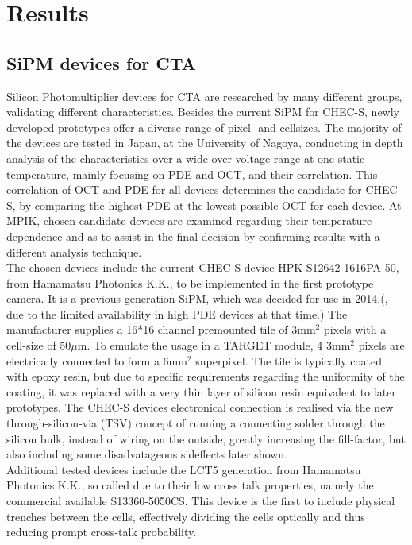 \documentclass[12pt,article,type=msc,colorback,accentcolor=tud9c]{tudthesis}
\begin{document}
\newpage
\section{Results}
\label{sec:results_ch}
\subsection{SiPM devices for CTA}
Silicon Photomultiplier devices for CTA are researched by many different groups, validating different characteristics. Besides the current SiPM for CHEC-S, newly developed prototypes offer a diverse range of pixel- and cellsizes. The majority of the devices are tested in Japan, at the University of Nagoya, conducting in depth analysis of the characteristics over a wide over-voltage range at one static temperature, mainly focusing on PDE and OCT, and their correlation. This correlation of OCT and PDE for all devices determines the candidate for CHEC-S, by comparing the highest PDE at the lowest possible OCT for each device. At MPIK, chosen candidate devices are examined regarding their temperature dependence and as to assist in the final decision by confirming results with a different analysis technique.\\
The chosen devices include the current CHEC-S device HPK S12642-1616PA-50, from Hamamatsu Photonics K.K., to be implemented in the first prototype camera. It is a previous generation SiPM, which was decided for use in 2014.(, due to the limited availability in high PDE devices at that time.) The manufacturer supplies a 16*16 channel premounted tile of 3mm$^2$ pixels with a cell-size of 50$\mu$m. To emulate the usage in a TARGET module, 4 3mm$^2$ pixels are electrically connected to form a 6mm$^2$ superpixel. The tile is typically coated with epoxy resin, but due to specific requirements regarding the uniformity of the coating, it was replaced with a very thin layer of silicon resin equivalent to later prototypes. The CHEC-S devices electronical connection is realised via the new through-silicon-via (TSV) concept of running a connecting solder through the silicon bulk, instead of wiring on the outside, greatly increasing the fill-factor, but also including some disadvatageous sideffects later shown.\\
Additional tested devices include the LCT5 generation from Hamamatsu Photonics K.K., so called due to their low cross talk properties, namely the commercial available S13360-5050CS. This device is the first to include physical trenches between the cells, effectively dividing the cells optically and thus reducing prompt cross-talk probability.\\
\end{document}
